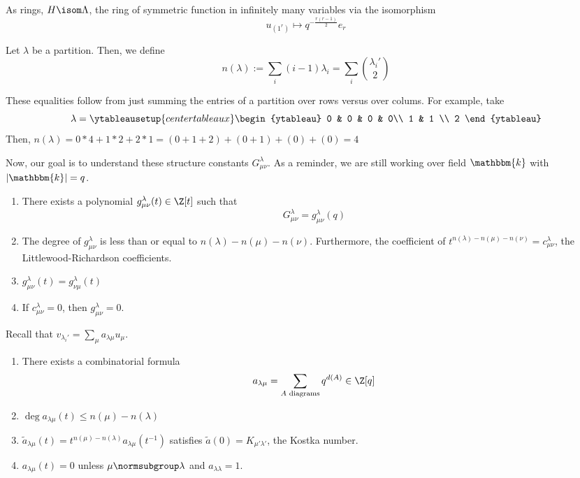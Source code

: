 \documentclass[11pt,leqno,oneside]{amsbook}
\numberwithin{thm}{section}
\newcommand{\bbk}{\mathbbm{k}} %
\newcommand{\subtableau}{\normsubgroup}
\newcommand{\SymF}{\Lambda} %
\begin{document}
\begin{cor}
  As rings, \(H \isom \SymF\), the ring of symmetric function in
  infinitely many variables via the isomorphism \[
    u_{(1^r)} \mapsto q^{-\frac{r(r-1)}{2}} e_r
  \]
\end{cor}
\begin{defn}
  Let \(\lambda\) be a partition. Then, we define \[
    n(\lambda) := \sum_i (i-1) \lambda_i = \sum_i \binom{\lambda_i'}{2}
  \]
\end{defn}
\begin{example}
    These equalities follow from just summing the entries of a partition
  over rows versus over colums. For example, take 
  \[
    \lambda = \ytableausetup{centertableaux}
    \begin{ytableau}
      0 & 0 & 0 & 0\\
      1 & 1 \\
      2
    \end{ytableau}
  \]
  Then, \(n(\lambda) = 0*4 + 1*2 + 2*1 = (0+1+2)+(0+1)+(0)+(0) = 4\)
\end{example}
Now, our goal is to understand these structure constants \(G_{\mu
  \nu}^\lambda\). As a reminder, we are still working over field
\(\bbk\) with \(|\bbk| = q\).
\begin{thm}[Steinitz]
  \begin{enumerate}
  \item There exists a polynomial \(g^\lambda_{\mu \nu}(t) \in \Z[t]\)
    such that \[
      G_{\mu \nu}^\lambda = g_{\mu \nu}^\lambda(q)
    \]
  \item The degree of \(g_{\mu \nu}^\lambda\) is less than or equal to
    \(n(\lambda) - n(\mu) - n(\nu)\). Furthermore, the coefficient of
    \(t^{n(\lambda)-n(\mu)-n(\nu)} = c_{\mu \nu}^\lambda\), the
    Littlewood-Richardson coefficients.
  \item \(g_{\mu \nu}^\lambda(t) = g_{\nu \mu}^\lambda(t)\)
  \item If \(c_{\mu \nu}^\lambda = 0\), then \(g_{\mu \nu}^\lambda = 0\).
  \end{enumerate}
\end{thm}
Recall that \(v_{\lambda_i'} = \sum_\mu a_{\lambda \mu} u_\mu\).
\begin{prop}
  \begin{enumerate}
  \item There exists a combinatorial formula \[
      a_{\lambda \mu} = \sum_{A \text{ diagrams}} q^{d(A)} \in \Z[q]
    \]
  \item \(\deg a_{\lambda \mu}(t) \leq n(\mu) - n(\lambda)\)
  \item \(\tilde{a}_{\lambda \mu}(t) = t^{n(\mu)-n(\lambda)}
    a_{\lambda \mu}(t^{-1})\) satisfies \(\tilde{a}(0) = K_{\mu'
      \lambda'}\), the Kostka number.
  \item \(a_{\lambda \mu}(t) = 0\) unless \(\mu \subtableau \lambda\)
    and \(a_{\lambda \lambda} = 1\). 
  \end{enumerate}
\end{prop}
\end{document}
